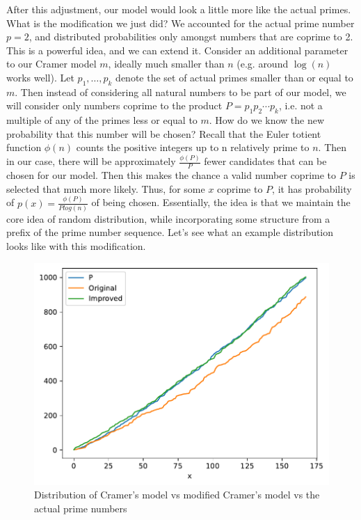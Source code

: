 \documentclass[conference]{IEEEtran}
\begin{document}
After this adjustment, our model would look a little more like the actual primes. What is the modification we just did? We accounted for the actual prime number $p = 2$, and distributed probabilities only amongst numbers that are coprime to 2. This is a powerful idea, and we can extend it. Consider an additional parameter to our Cramer model $m$, ideally much smaller than $n$ (e.g. around $\log(n)$\cite{b1} works well). Let $p_1, \dots, p_k$ denote the set of actual primes smaller than or equal to $m$. Then instead of considering all natural numbers to be part of our model, we will consider only numbers coprime to the product $P = p_1p_2\cdots p_k$, i.e. not a multiple of any of the primes less or equal to $m$. How do we know the new probability that this number will be chosen? Recall that the Euler totient function $\phi(n)$ counts the positive integers up to n relatively prime to $n$. Then in our case, there will be approximately $\frac{\phi(P)}{P}$ fewer candidates that can be chosen for our model. Then this makes the chance a valid number coprime to $P$ is selected that much more likely. Thus, for some $x$ coprime to $P$, it has probability of $p(x) = \frac{\phi(P)}{Plog(n)}$ of being chosen. Essentially, the idea is that we maintain the core idea of random distribution, while incorporating some structure from a prefix of the prime number sequence. Let's see what an example distribution looks like with this modification.

\begin{figure}[H]
  \centering
  \includegraphics[width=\linewidth,keepaspectratio]{../images/Improvement.pdf}
  \caption{Distribution of Cramer's model vs modified Cramer's model vs the actual prime numbers}
\end{figure}
\end{document}
